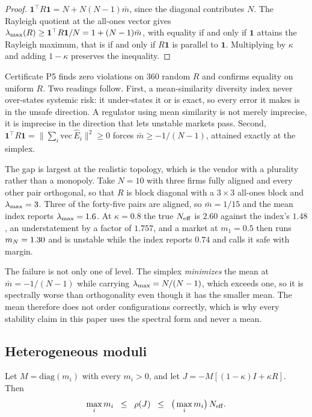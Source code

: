 \begin{proof}
$\mathbf{1}^{\top}R\mathbf{1} = N + N(N-1)\bar{m}$, since the diagonal contributes $N$. The Rayleigh quotient at the all-ones vector gives $\lambda_{\max}(R) \geq \mathbf{1}^{\top}R\mathbf{1}/N = 1 + (N-1)\bar{m}$, with equality if and only if $\mathbf{1}$ attains the Rayleigh maximum, that is if and only if $R\mathbf{1}$ is parallel to $\mathbf{1}$. Multiplying by $\kappa$ and adding $1-\kappa$ preserves the inequality.
\end{proof}

Certificate P5 finds zero violations on 360 random $R$ and confirms equality on uniform $R$. Two readings follow. First, a mean-similarity diversity index never over-states systemic risk: it under-states it or is exact, so every error it makes is in the unsafe direction. A regulator using mean similarity is not merely imprecise, it is imprecise in the direction that lets unstable markets pass. Second, $\mathbf{1}^{\top}R\mathbf{1} = \|\sum_i \mathrm{vec}\,\hat{E}_i\|^2 \geq 0$ forces $\bar{m} \geq -1/(N-1)$, attained exactly at the simplex.

The gap is largest at the realistic topology, which is the vendor with a plurality rather than a monopoly. Take $N=10$ with three firms fully aligned and every other pair orthogonal, so that $R$ is block diagonal with a $3\times 3$ all-ones block and $\lambda_{\max} = 3$. Three of the forty-five pairs are aligned, so $\bar{m} = 1/15$ and the mean index reports $\lambda_{\max} = 1.6$. At $\kappa = 0.8$ the true $N_{\mathrm{eff}}$ is $2.60$ against the index's $1.48$, an understatement by a factor of $1.757$, and a market at $m_1 = 0.5$ then runs $m_N = 1.30$ and is unstable while the index reports $0.74$ and calls it safe with margin.

The failure is not only one of level. The simplex \emph{minimizes} the mean at $\bar{m} = -1/(N-1)$ while carrying $\lambda_{\max} = N/(N-1)$, which exceeds one, so it is spectrally worse than orthogonality even though it has the smaller mean. The mean therefore does not order configurations correctly, which is why every stability claim in this paper uses the spectral form and never a mean.

\subsection{Heterogeneous moduli}

\begin{aproposition}
\label{prop:hetmod}
Let $M=\mathrm{diag}(m_i)$ with every $m_i>0$, and let $J = -M[(1-\kappa)I+\kappa R]$. Then
\[
  \max_i m_i \;\;\leq\;\; \rho(J) \;\;\leq\;\; \big(\max_i m_i\big)\,N_{\mathrm{eff}} .
\]
\end{aproposition}

